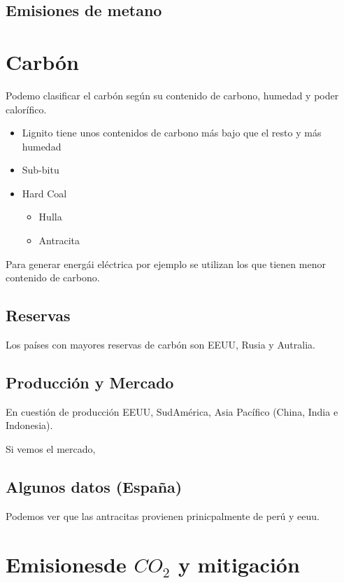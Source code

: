 \subsection{Emisiones de metano}

\section{Carbón}

Podemo clasificar el carbón según su contenido de carbono, humedad y poder calorífico.

\begin{itemize}
    \item Lignito tiene unos contenidos de carbono más bajo que el resto y más humedad
    \item Sub-bitu
    \item Hard Coal 
    \begin{itemize}
        \item Hulla
        \item Antracita
    \end{itemize}
\end{itemize}

Para generar energái eléctrica por ejemplo se utilizan los que tienen menor contenido de carbono. 


\subsection{Reservas}

Los países con mayores reservas de carbón son EEUU, Rusia y Autralia. 

\subsection{Producción y Mercado}

En cuestión de producción EEUU, SudAmérica, Asia Pacífico (China, India e Indonesia).

Si vemos el mercado,

\subsection{Algunos datos (España)}

Podemos ver que las antracitas provienen prinicpalmente de perú y eeuu.

\section{Emisionesde $CO_2$ y mitigación }